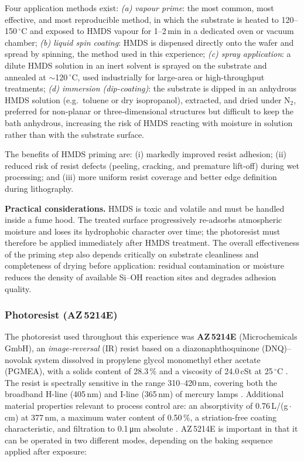 Four application methods exist: \emph{(a) vapour prime}: the most
common, most effective, and most reproducible method, in which the
substrate is heated to 120--150\,$^\circ$C and exposed to HMDS vapour
for 1--2\,min in a dedicated oven or vacuum chamber; \emph{(b) liquid
spin coating}: HMDS is dispensed directly onto the wafer and spread
by spinning, the method used in this experience; \emph{(c) spray
application}: a dilute HMDS solution in an inert solvent is sprayed
on the substrate and annealed at $\sim$120\,$^\circ$C, used
industrially for large-area or high-throughput treatments; \emph{(d)
immersion (dip-coating)}: the substrate is dipped in an anhydrous
HMDS solution (e.g.\ toluene or dry isopropanol), extracted, and
dried under N$_2$, preferred for non-planar or three-dimensional
structures but difficult to keep the bath anhydrous, increasing the
risk of HMDS reacting with moisture in solution rather than with the
substrate surface.

The benefits of HMDS priming are: (i) markedly improved resist
adhesion; (ii) reduced risk of resist defects (peeling, cracking, and
premature lift-off) during wet processing; and (iii) more uniform
resist coverage and better edge definition during lithography.

\textbf{Practical considerations.} HMDS is toxic and volatile and
must be handled inside a fume hood. The treated surface progressively
re-adsorbs atmospheric moisture and loses its hydrophobic character
over time; the photoresist must therefore be applied immediately
after HMDS treatment. The overall effectiveness of the priming step
also depends critically on substrate cleanliness and completeness of
drying before application: residual contamination or moisture reduces
the density of available Si--OH reaction sites and degrades adhesion quality.

\subsubsection{Photoresist (AZ\,5214E)}

The photoresist used throughout this experience was \textbf{AZ\,5214E}
(Microchemicals GmbH), an \emph{image-reversal} (IR) resist based on a
diazonaphthoquinone (DNQ)--novolak system dissolved in propylene
glycol monomethyl
ether acetate (PGMEA), with a solids content of 28.3\,\% and a viscosity of
24.0\,cSt at 25\,$^\circ$C \cite{AZ5214E_TDS}. The resist is
spectrally sensitive
in the range 310--420\,nm, covering both the broadband H-line
(405\,nm) and I-line
(365\,nm) of mercury lamps \cite{AZ5214E_TDS}. Additional material
properties relevant to process control are: an absorptivity of
0.76\,L/(g\,$\cdot$\,cm) at 377\,nm, a maximum water content of
0.50\,\%, a striation-free coating characteristic, and filtration to
0.1\,\si{\micro\meter} absolute \cite{AZ5214E_TDS}. AZ\,5214E is
important in that it
can be operated in two different modes, depending on the baking
sequence applied after
exposure:

